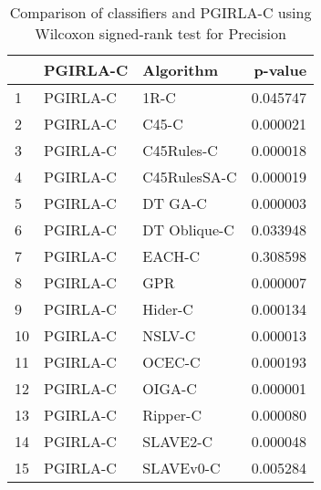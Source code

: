 \begin{table}
\footnotesize
\caption{Comparison of classifiers and PGIRLA-C using Wilcoxon signed-rank test for Precision}
\label{tab:PGIRLA-C wilcoxon Precision comparison}
\begin{tabular}{lllr}
\hline
 & PGIRLA-C & Algorithm & p-value \\
\hline
1 & PGIRLA-C & 1R-C & 0.045747 \\
2 & PGIRLA-C & C45-C & 0.000021 \\
3 & PGIRLA-C & C45Rules-C & 0.000018 \\
4 & PGIRLA-C & C45RulesSA-C & 0.000019 \\
5 & PGIRLA-C & DT GA-C & 0.000003 \\
6 & PGIRLA-C & DT Oblique-C & 0.033948 \\
7 & PGIRLA-C & EACH-C & 0.308598 \\
8 & PGIRLA-C & GPR & 0.000007 \\
9 & PGIRLA-C & Hider-C & 0.000134 \\
10 & PGIRLA-C & NSLV-C & 0.000013 \\
11 & PGIRLA-C & OCEC-C & 0.000193 \\
12 & PGIRLA-C & OIGA-C & 0.000001 \\
13 & PGIRLA-C & Ripper-C & 0.000080 \\
14 & PGIRLA-C & SLAVE2-C & 0.000048 \\
15 & PGIRLA-C & SLAVEv0-C & 0.005284 \\
\hline
\end{tabular}
\end{table}
